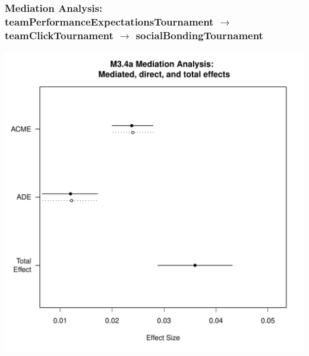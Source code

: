 \documentclass[12pt]{report}
\begin{document}
\subsubsection{Mediation Analysis: teamPerformanceExpectationsTournament $\rightarrow$ teamClickTournament $\rightarrow$ socialBondingTournament}


\includegraphics[width =\columnwidth]{../images/MLM34aMediationAnalysis.pdf}
\end{document}
